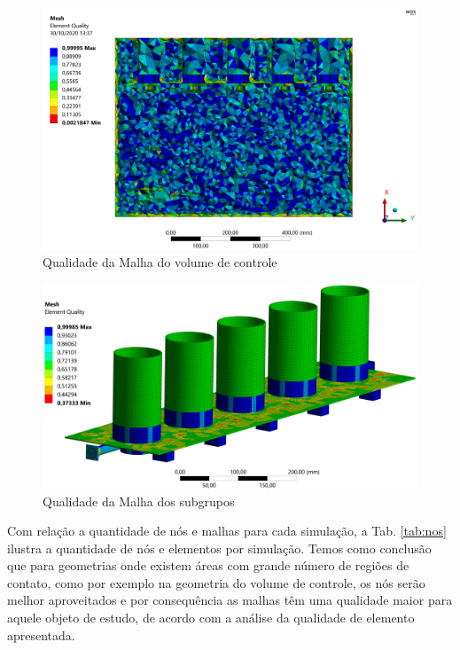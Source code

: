 \begin{figure}[H]
        \centering
        \includegraphics[width=1\textwidth]{figuras/estrutura/InteracaoFusoEng/meshqualityT.png}
        \caption{Qualidade da Malha do volume de controle}
        \label{fig:malha_vol}
    \end{figure}
    
\begin{figure}[H]
        \centering
        \includegraphics[width=1\textwidth]{figuras/estrutura/Imagens PC3/Malhas/subgrupos malha.png}
        \caption{Qualidade da Malha dos subgrupos}
        \label{fig:malha_sub}
\end{figure}
   
    

Com relação a quantidade de nós e malhas para cada simulação, a Tab. \ref{tab:nos} ilustra a quantidade de nós e elementos por simulação. Temos como conclusão que para geometrias onde existem áreas com grande número de regiões de contato, como por exemplo na geometria do volume de controle, os nós serão melhor aproveitados e por consequência as malhas têm uma qualidade maior para aquele objeto de estudo, de acordo com a análise da qualidade de elemento apresentada.

